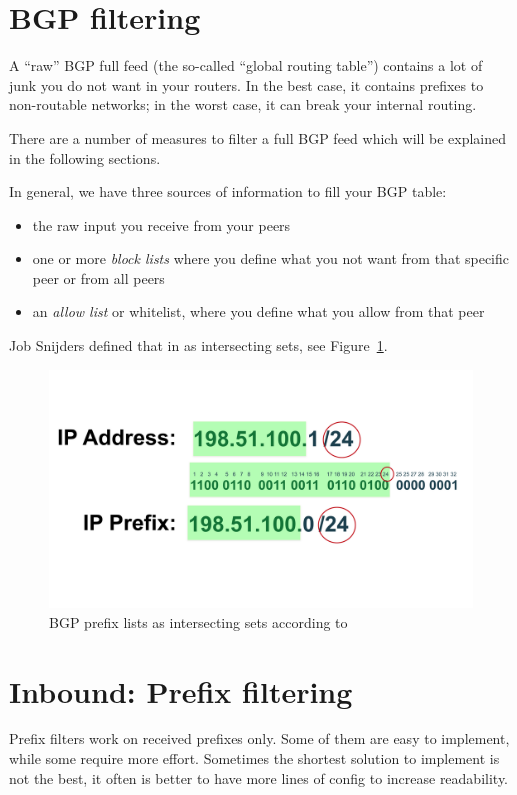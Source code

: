 \section{BGP filtering}
A ``raw'' BGP full feed (the so-called ``global routing table'') contains a lot of junk you do not want in your routers. In the best case, it contains prefixes to non-routable networks; in the worst case, it can break your internal routing.

There are a number of measures to filter a full BGP feed which will be explained in the following sections.

In general, we have three sources of information to fill your BGP table:
\begin{itemize}
  \item the raw input you receive from your peers
  \item one or more \emph{block lists} where you define what you not want from that specific peer or from all peers
  \item an \emph{allow list} or whitelist, where you define what you allow from that peer
\end{itemize}

Job Snijders defined that in \cite{ripe77jsbgp} as intersecting sets, see
Figure~\ref{fig:goodbadugly}.

\begin{figure}
  \centering
  \includegraphics[width=\linewidth,page=14]{img/Drawings.pdf}
  \caption{BGP prefix lists as intersecting sets according to \cite{ripe77jsbgp}}
  \label{fig:goodbadugly}
\end{figure}

\section{Inbound: Prefix filtering}
\label{sec:inboundprefixfiltering}
Prefix filters work on received prefixes only. Some of them are easy to implement, while some require more effort. Sometimes the shortest solution to implement is not the best, it often is better to have more lines of config to increase readability.

